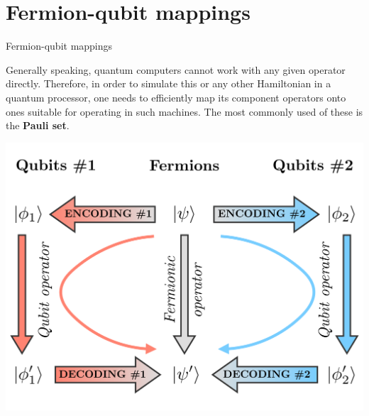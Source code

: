 
\section{Fermion-qubit mappings}


\begin{frame}{Fermion-qubit mappings}

	Generally speaking, quantum computers cannot work with any given operator directly. Therefore, in order to simulate this or any other Hamiltonian in a quantum processor, one needs to efficiently map its component operators onto ones suitable for operating in such machines. The most commonly used of these is the \textbf{Pauli set}.

  \begin{center}
    \includegraphics[width=.40\paperwidth]{Figures/chapter03/simulation-mapping}
  \end{center}

\end{frame}



